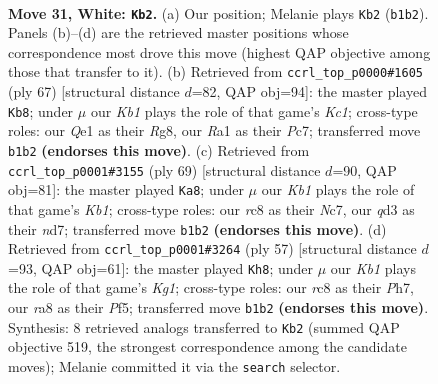 \documentclass[11pt]{article}
\begin{document}
\clearpage

\begin{figure}[p]\centering
\begin{subfigure}{0.46\textwidth}\centering
\resizebox{\linewidth}{!}{%
\newchessgame
\chessboard[
  setfen={r1r5/n3k3/1p2p3/pP3pN1/5n1p/3q3P/P5P1/RK2Q2R w - - 4 31},
  showmover=false,
  pgfstyle=straightmove, color=movearrow, markmove={b1-b2}
]}
\caption{}
\end{subfigure}\hfill
\begin{subfigure}{0.46\textwidth}\centering
\resizebox{\linewidth}{!}{%
\newchessgame
\chessboard[
  setfen={2k3rr/2p2p2/Q3p3/4P2p/4PN2/1P6/P1q3PP/5RK1 b - - 3 34},
  showmover=false,
  pgfstyle=straightmove, color=movearrow, markmove={c8-b8}
]}
\caption{}
\end{subfigure}
\\[4pt]
\begin{subfigure}{0.46\textwidth}\centering
\resizebox{\linewidth}{!}{%
\newchessgame
\chessboard[
  setfen={1k1r3r/1pnN1pp1/p7/1P1pP3/8/1q6/1P3QP1/1K2R2R b - - 3 35},
  showmover=false,
  pgfstyle=straightmove, color=movearrow, markmove={b8-a8}
]}
\caption{}
\end{subfigure}\hfill
\begin{subfigure}{0.46\textwidth}\centering
\resizebox{\linewidth}{!}{%
\newchessgame
\chessboard[
  setfen={3r2k1/4pp1p/1p1p4/1N3pQ1/1PP5/4P3/rq4PP/2R2RK1 b - - 0 29},
  showmover=false,
  pgfstyle=straightmove, color=movearrow, markmove={g8-h8}
]}
\caption{}
\end{subfigure}
\caption{\textbf{Move 31, White: \texttt{Kb2}.} (a) Our position; Melanie plays \texttt{Kb2} (\texttt{b1b2}). Panels (b)--(d) are the retrieved master positions whose correspondence most drove this move (highest QAP objective among those that transfer to it). (b) Retrieved from \texttt{ccrl\_top\_p0000\#1605} (ply 67) [structural distance $d$=82, QAP obj=94]: the master played \texttt{Kb8}; under $\mu$ our \emph{Kb1} plays the role of that game's \emph{Kc1}; cross-type roles: our \emph{Q}e1 as their \emph{R}g8, our \emph{R}a1 as their \emph{P}c7; transferred move \texttt{b1b2} \textbf{(endorses this move)}. (c) Retrieved from \texttt{ccrl\_top\_p0001\#3155} (ply 69) [structural distance $d$=90, QAP obj=81]: the master played \texttt{Ka8}; under $\mu$ our \emph{Kb1} plays the role of that game's \emph{Kb1}; cross-type roles: our \emph{r}c8 as their \emph{N}c7, our \emph{q}d3 as their \emph{n}d7; transferred move \texttt{b1b2} \textbf{(endorses this move)}. (d) Retrieved from \texttt{ccrl\_top\_p0001\#3264} (ply 57) [structural distance $d$=93, QAP obj=61]: the master played \texttt{Kh8}; under $\mu$ our \emph{Kb1} plays the role of that game's \emph{Kg1}; cross-type roles: our \emph{r}c8 as their \emph{P}h7, our \emph{r}a8 as their \emph{P}f5; transferred move \texttt{b1b2} \textbf{(endorses this move)}. Synthesis: 8 retrieved analogs transferred to \texttt{Kb2} (summed QAP objective 519, the strongest correspondence among the candidate moves); Melanie committed it via the \texttt{search} selector.}
\label{fig:thought-m60}
\end{figure}
\end{document}
